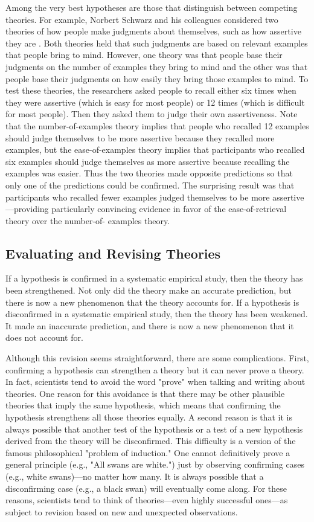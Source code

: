 Among the very best hypotheses are those that distinguish between competing theories. For example, Norbert Schwarz and his colleagues considered two theories of how people make judgments about themselves, such as how assertive they are \citep{schwarz_context_1991}. Both theories held that such judgments are based on relevant examples that people bring to mind. However, one theory was that people base their judgments on the number of examples they bring to mind and the other was that people base their judgments on how easily they bring those examples to mind. To test these theories, the researchers asked people to recall either six times when they were assertive (which is easy for most people) or 12 times (which is difficult for most people). Then they asked them to judge their own assertiveness. Note that the number-of-examples theory implies that people who recalled 12 examples should judge themselves to be more assertive because they recalled more examples, but the ease-of-examples theory implies that participants who recalled six examples should judge themselves as more assertive because recalling the examples was easier. Thus the two theories made opposite predictions so that only one of the predictions could be confirmed. The surprising result was that participants who recalled fewer examples judged themselves to be more assertive---providing particularly convincing evidence in favor of the ease-of-retrieval theory over the number-of- examples theory.

\subsection{Evaluating and Revising Theories}


If a hypothesis is confirmed in a systematic empirical study, then the theory has been strengthened. Not only did the theory make an accurate prediction, but there is now a new phenomenon that the theory accounts for. If a hypothesis is disconfirmed in a systematic empirical study, then the theory has been weakened. It made an inaccurate prediction, and there is now a new phenomenon that it does not account for.

Although this revision seems straightforward, there are some complications. First, confirming a hypothesis can strengthen a theory but it can never prove a theory. In fact, scientists tend to avoid the word "prove" when talking and writing about theories. One reason for this avoidance is that there may be other plausible theories that imply the same hypothesis, which means that confirming the hypothesis strengthens all those theories equally. A second reason is that it is always possible that another test of the hypothesis or a test of a new hypothesis derived from the theory will be disconfirmed. This difficulty is a version of the famous philosophical "problem of induction." One cannot definitively prove a general principle (e.g., "All swans are white.") just by observing confirming cases (e.g., white swans)---no matter how many. It is always possible that a disconfirming case (e.g., a black swan) will eventually come along. For these reasons, scientists tend to think of theories---even highly successful ones---as subject to revision based on new and unexpected observations.


